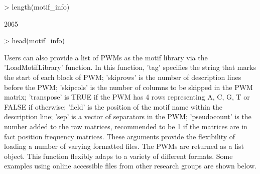 \documentclass[a4paper,10pt]{article}
\begin{document}
\begin{Schunk}
\begin{Sinput}
> length(motif_info)
\end{Sinput}
\begin{Soutput}
[1] 2065
\end{Soutput}
\begin{Sinput}
> head(motif_info)
\end{Sinput}
\end{Schunk}

Users can also provide a list of PWMs as the motif library via the 'LoadMotifLibrary' function. In this function, 'tag' specifies the string that marks the start of each block of PWM; 'skiprows' is the number of description lines before the PWM; 'skipcols' is the number of columns to be skipped in the PWM matrix; 'transpose' is TRUE if the PWM has 4 rows representing A, C, G, T or FALSE if otherwise; 'field' is the position of the motif name within the description line; 'sep' is a vector of separators in the PWM; 'pseudocount' is the number added to the raw matrices, recommended to be 1 if the matrices are in fact position frequency matrices. These arguments provide the flexibility of loading a number of varying formatted files. The PWMs are returned as a list object. This function flexibly adaps to a variety of different formats. Some examples using online accessible files from other research groups are shown below.
\end{document}
